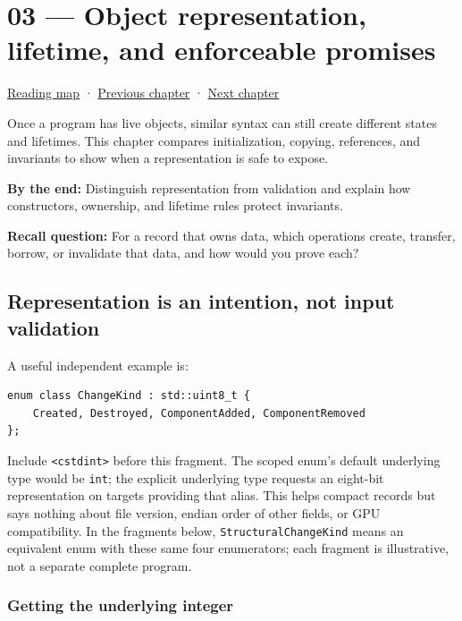 \hypertarget{05-engine-i-ch003}{}
\chapter{03 --- Object representation, lifetime, and enforceable promises}\label{05-engine-i-ch003-object-representation-lifetime-and-enforceable-promises}

\hyperref[volume-reading-map]{Reading map} · \hyperref[05-engine-i-ch002]{Previous chapter} · \hyperref[05-engine-i-ch004]{Next chapter}

Once a program has live objects, similar syntax can still create different states and lifetimes. This chapter compares initialization, copying, references, and invariants to show when a representation is safe to expose.

\textbf{By the end:} Distinguish representation from validation and explain how constructors, ownership, and lifetime rules protect invariants.

\textbf{Recall question:} For a record that owns data, which operations create, transfer, borrow, or invalidate that data, and how would you prove each?

\section{Representation is an intention, not input validation}\label{05-engine-i-ch003-representation-is-an-intention-not-input-validation}

A useful independent example is:

\begin{verbatim}
enum class ChangeKind : std::uint8_t {
    Created, Destroyed, ComponentAdded, ComponentRemoved
};
\end{verbatim}

Include \texttt{\textless{}cstdint\textgreater{}} before this fragment. The scoped enum's default underlying type would be \texttt{int}; the explicit underlying type requests an eight-bit representation on targets providing that alias. This helps compact records but says nothing about file version, endian order of other fields, or GPU compatibility. In the fragments below, \texttt{StructuralChangeKind} means an equivalent enum with these same four enumerators; each fragment is illustrative, not a separate complete program.

\subsection{Getting the underlying integer}\label{05-engine-i-ch003-getting-the-underlying-integer}

